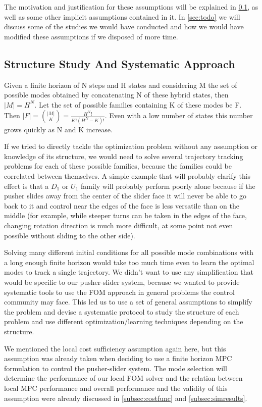 \documentclass[12,twoside]{TFG-GM}
\theoremstyle{definition}
\theoremstyle{remark}
\begin{document}
The motivation and justification for these assumptions will be explained in \ref{subsec:structure}, as well as some other implicit assumptions contained in it. In \ref{sec:todo} we will discuss some of the studies we would have conducted and how we would have modified these assumptions if we disposed of more time.

\subsection{Structure Study And Systematic Approach}
\label{subsec:structure}
Given a finite horizon of N steps and H states and considering M the set of possible modes obtained by concatenating N of these hybrid states, then $|M| = H^N$. Let the set of possible families containing K of these modes be F. Then $|F| = \binom {|M|}{K} = \frac{H^{N}!}{K!(H^N-K)!}$. Even with a low number of states this number grows quickly as N and K increase.

If we tried to directly tackle the optimization problem without any assumption or knowledge of its structure, we would need to solve several trajectory tracking problems for each of these possible families, because the families could be correlated between themselves. A simple example that will probably clarify this effect is that a $D_1$ or $U_1$ family will probably perform poorly alone because if the pusher slides away from the center of the slider face it will never be able to go back to it and control near the edges of the face is less versatile than on the middle (for example, while steeper turns can be taken in the edges of the face, changing rotation direction is much more difficult, at some point not even possible without sliding to the other side).

Solving many different initial conditions for all possible mode combinations with a long enough finite horizon would take too much time even to learn the optimal modes to track a single trajectory. We didn't want to use any simplification that would be specific to our pusher-slider system, because we wanted to provide systematic tools to use the FOM approach in general problems the control community may face. This led us to use a set of general assumptions to simplify the problem and devise a systematic protocol to study the structure of each problem and use different optimization/learning techniques depending on the structure.

We mentioned the local cost sufficiency assumption again here, but this assumption was already taken when deciding to use a finite horizon MPC formulation to control the pusher-slider system. The mode selection will determine the performance of our local FOM solver and the relation between local MPC performance and overall performance and the validity of this assumption were already discussed in \ref{subsec:costfunc} and \ref{subsec:simresults}.
\end{document}
